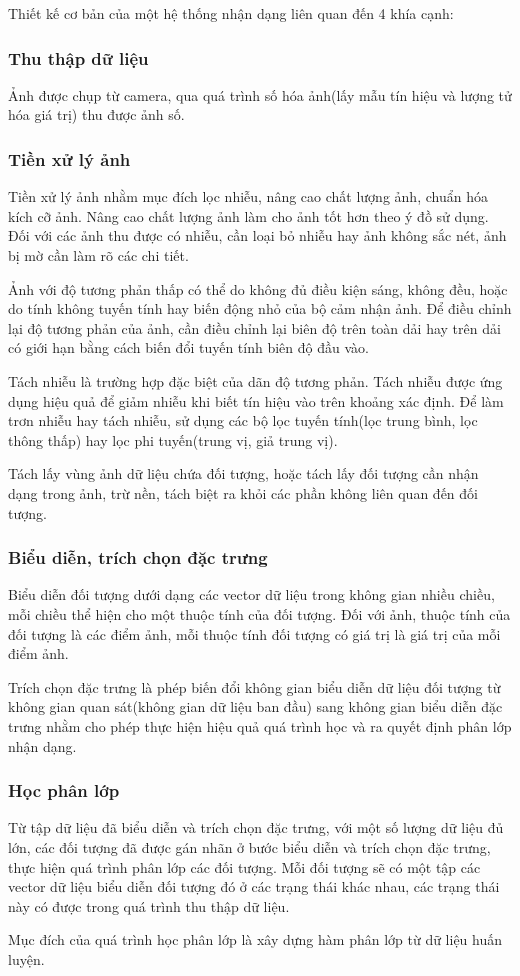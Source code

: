 \documentclass[12pt,a4paper]{article}
\begin{document}
Thiết kế cơ bản của một hệ thống nhận dạng liên quan đến 4 khía cạnh: 
\subsubsection{Thu thập dữ liệu}
Ảnh được chụp từ camera, qua quá trình số hóa ảnh(lấy mẫu tín hiệu và lượng tử hóa giá trị) thu được ảnh số. 
\subsubsection{Tiền xử lý ảnh}
Tiền xử lý ảnh nhằm mục đích lọc nhiễu, nâng cao chất lượng ảnh, chuẩn hóa kích cỡ ảnh. Nâng cao chất lượng ảnh làm cho ảnh tốt hơn theo ý đồ sử dụng. Đối với các ảnh thu được có nhiễu, cần loại bỏ nhiễu hay ảnh không sắc nét, ảnh bị mờ cần làm rõ các chi tiết. \par 
Ảnh với độ tương phản thấp có thể do không đủ điều kiện sáng, không đều, hoặc do tính không tuyến tính hay biến động nhỏ của bộ cảm nhận ảnh. Để điều chỉnh lại độ tương phản của ảnh, cần điều chỉnh lại biên độ trên toàn dải hay trên dải có giới hạn bằng cách biến đổi tuyến tính biên độ đầu vào. \par 
Tách nhiễu là trường hợp đặc biệt của dãn độ tương phản. Tách nhiễu được ứng dụng hiệu quả để giảm nhiễu khi biết tín hiệu vào trên khoảng xác định. Để làm trơn nhiễu hay tách nhiễu, sử dụng các bộ lọc tuyến tính(lọc trung bình, lọc thông thấp) hay lọc phi tuyến(trung vị, giả trung vị). \par 
Tách lấy vùng ảnh dữ liệu chứa đối tượng, hoặc tách lấy đối tượng cần nhận dạng trong ảnh, trừ nền, tách biệt ra khỏi các phần không liên quan đến đối tượng. 
\subsubsection{Biểu diễn, trích chọn đặc trưng}
Biểu diễn đối tượng dưới dạng các vector dữ liệu trong không gian nhiều chiều, mỗi chiều thể hiện cho một thuộc tính của đối tượng. Đối với ảnh, thuộc tính của đối tượng là các điểm ảnh, mỗi thuộc tính đối tượng có giá trị là giá trị của mỗi điểm ảnh. \par 
Trích chọn đặc trưng là phép biến đổi không gian biểu diễn dữ liệu đối tượng từ không gian quan sát(không gian dữ liệu ban đầu) sang không gian biểu diễn đặc trưng nhằm cho phép thực hiện hiệu quả quá trình học và ra quyết định phân lớp nhận dạng. 
\subsubsection{Học phân lớp}
Từ tập dữ liệu đã biểu diễn và trích chọn đặc trưng, với một số lượng dữ liệu đủ lớn, các đối tượng đã được gán nhãn ở bước biểu diễn và trích chọn đặc trưng, thực hiện quá trình phân lớp các đối tượng. Mỗi đối tượng sẽ có một tập các vector dữ liệu biểu diễn đối tượng đó ở các trạng thái khác nhau, các trạng thái này có được trong quá trình thu thập dữ liệu. \par 
Mục đích của quá trình học phân lớp là xây dựng hàm phân lớp từ dữ liệu huấn luyện. 
\end{document}
